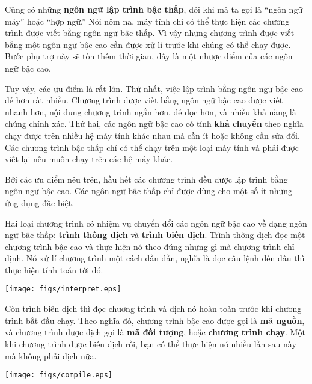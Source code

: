\documentclass[11pt]{book}
\begin{document}
Cũng có những {\bf ngôn ngữ lập trình bậc thấp}, đôi khi mà ta gọi là
``ngôn ngữ máy'' hoặc ``hợp ngữ.''  Nói nôm na, máy tính chỉ có thể thực
hiện các chương trình được viết bằng ngôn ngữ bậc thấp.  Vì vậy những
chương trình được viết bằng một ngôn ngữ bậc cao cần được xử lí trước khi 
chúng có thể chạy được. Bước phụ trợ này sẽ tốn thêm thời gian, đây là một
nhược điểm của các ngôn ngữ bậc cao.


Tuy vậy, các ưu điểm là rất lớn. Thứ nhất, việc lập trình bằng ngôn ngữ
bậc cao dễ hơn rất nhiều. Chương trình được viết bằng ngôn ngữ bậc cao 
được viết nhanh hơn, nội dung chương trình ngắn hơn, dễ đọc hơn, và nhiều
khả năng là chúng chính xác.  Thứ hai, các ngôn ngữ bậc cao có tính {\bf
khả chuyển} theo nghĩa chạy được trên nhiều hệ máy tính khác nhau mà 
cần ít hoặc không cần sửa đổi. Các chương trình bậc thấp chỉ có thể chạy
trên một loại máy tính và phải được viết lại nếu muốn chạy trên các hệ máy khác.

Bởi các ưu điểm nêu trên, hầu hết các chương trình đều được lập trình bằng
ngôn ngữ bậc cao. Các ngôn ngữ bậc thấp chỉ được dùng cho một số ít những
ứng dụng đặc biệt.


Hai loại chương trình có nhiệm vụ chuyển đổi các ngôn ngữ bậc cao về dạng
ngôn ngữ bậc thấp: \textbf{trình thông dịch} và \textbf{trình biên dịch}.
Trình thông dịch đọc một chương trình bậc cao và thực hiện nó theo
đúng những gì mà chương trình chỉ định. Nó xử lí chương trình một cách dần dần,
nghĩa là đọc câu lệnh đến đâu thì thực hiện tính toán tới đó.

\beforefig
\centerline{\texttt{[image: figs/interpret.eps]}}
\afterfig


Còn trình biên dịch thì đọc chương trình và dịch nó hoàn toàn trước khi
chương trình bắt đầu chạy. Theo nghĩa đó, chương trình bậc cao được
gọi là \textbf{mã nguồn}, và chương trình được dịch gọi là \textbf{mã
đối tượng}, hoặc \textbf{chương trình chạy}. Một khi chương trình được
biên dịch rồi, bạn có thể thực hiện nó nhiều lần sau này mà không phải
dịch nữa.

\beforefig
\centerline{\texttt{[image: figs/compile.eps]}}
\afterfig
\end{document}
